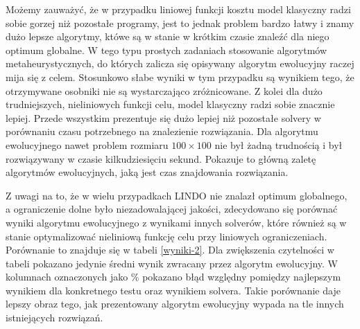 Możemy zauważyć, że w przypadku liniowej funkcji kosztu model klasyczny radzi sobie gorzej niż pozostałe programy, jest to jednak problem bardzo 
łatwy i znamy dużo lepsze algorytmy, któwe są w stanie w krótkim czasie znaleźć dla niego optimum globalne. W tego typu prostych zadaniach stosowanie 
algorytmów metaheurystycznych, do których zalicza się opisywany algorytm ewolucyjny raczej mija się z celem. Stosunkowo słabe wyniki w tym przypadku 
są wynikiem tego, że otrzymywane osobniki nie są wystarczająco zróżnicowane. Z kolei dla dużo trudniejszych, nieliniowych 
funkcji celu, model klasyczny radzi sobie znacznie lepiej. Przede wszystkim prezentuje się dużo lepiej niż pozostałe solvery w porównaniu czasu 
potrzebnego na znalezienie rozwiązania. Dla algorytmu ewolucyjnego nawet problem rozmiaru $100 \times 100$ nie był żadną trudnością i 
był rozwiązywany w czasie kilkudziesięciu sekund. Pokazuje to główną zaletę algorytmów ewolucyjnych, jaką jest czas znajdowania rozwiązania.

Z uwagi na to, że w wielu przypadkach LINDO nie znalazł optimum globalnego, a ograniczenie dolne było niezadowalającej jakości, zdecydowano się 
porównać wyniki algorytmu ewolucyjnego z wynikami innych solverów, które również są w stanie optymalizować nieliniową funkcję celu 
przy liniowych ograniczeniach. Porównanie to znajduje się w tabeli \ref{wyniki-2}. Dla zwiększenia czytelności w tabeli pokazano jedynie średni wynik 
zwracany przez algorytm ewolucyjny. W kolumnach oznaczonych jako \% pokazano błąd względny pomiędzy najlepszym wynikiem dla konkretnego testu oraz 
wynikiem solvera. Takie porównanie daje lepszy obraz tego, jak prezentowany algorytm ewolucyjny wypada na tle innych istniejących rozwiązań.

